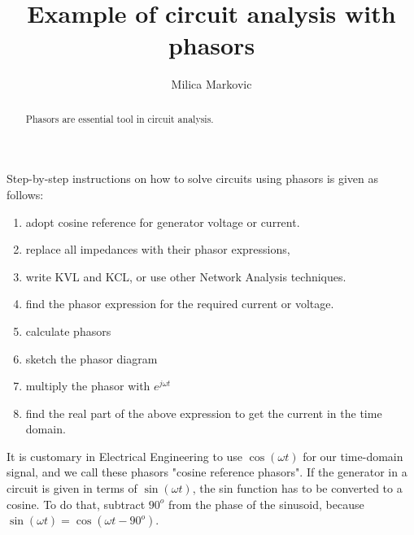 \documentclass{ximera}
\title{Example of circuit analysis with phasors}
\author{Milica Markovic}
\begin{document}
  
\begin{abstract}  
Phasors are essential tool in circuit analysis.
\end{abstract}  
\maketitle    




 Step-by-step instructions on how to solve circuits using phasors is given as follows:
\begin{enumerate}
\item adopt cosine reference for generator voltage or current. 
\item replace all impedances with their phasor expressions,
\item write KVL and KCL, or use other Network Analysis techniques.
\item find the phasor expression for the required current or voltage. 
\item calculate phasors 
\item sketch the phasor diagram
\item multiply the phasor with $e^{j \omega t}$  
\item find the real part of the above expression to get the current in the time domain.
\end{enumerate}


It is customary in Electrical Engineering to use  $\cos( \omega t)$ for our time-domain signal, and we call these phasors "cosine reference phasors".  If the generator in a circuit is given in terms of $\sin (\omega t)$, the sin function has to be converted to a cosine. To do that, subtract $90^o$ from the phase of the sinusoid, because $\sin( \omega t) = \cos(\omega t - 90^o)$.
\end{document}
